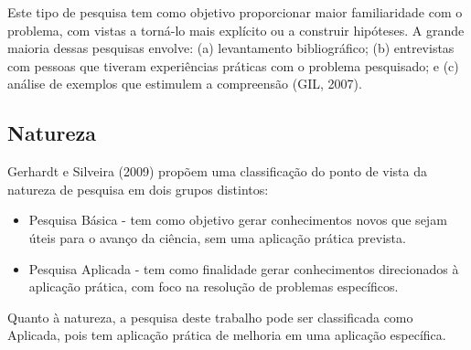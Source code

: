 Este tipo de pesquisa tem como objetivo proporcionar maior familiaridade com o problema, com vistas a torná-lo mais explícito ou a construir hipóteses. A grande maioria dessas pesquisas envolve: (a) levantamento 
bibliográfico; (b) entrevistas com pessoas que tiveram experiências práticas com o problema pesquisado; e (c) análise de exemplos que estimulem a compreensão (GIL, 2007).

\subsection{Natureza}
\label{sec:Natureza}
Gerhardt e Silveira (2009) propõem uma classificação do ponto de vista da natureza de pesquisa em dois grupos distintos:

\begin{itemize}
	\item Pesquisa Básica - tem como objetivo gerar conhecimentos novos que sejam úteis para o avanço da ciência, sem uma aplicação prática prevista.
	\item Pesquisa Aplicada - tem como finalidade gerar conhecimentos direcionados à aplicação prática, com foco na resolução de problemas específicos.
\end{itemize}

Quanto à natureza, a pesquisa deste trabalho pode ser classificada como Aplicada, pois tem aplicação prática de melhoria em uma aplicação específica.